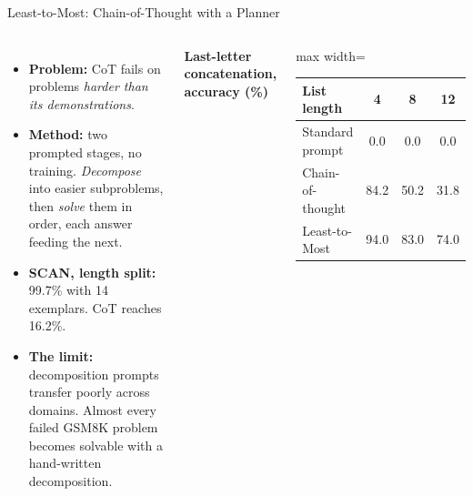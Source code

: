 \begin{frame}{Least-to-Most: Chain-of-Thought with a Planner}
    \begin{columns}[T,onlytextwidth]
        \begin{itemize}\itemsep0.45em
            \item \textbf{Problem:} CoT fails on problems \emph{harder than its demonstrations}.
            \item \textbf{Method:} two prompted stages, no training. \emph{Decompose} into easier subproblems, then \emph{solve} them in order, each answer feeding the next.
            \item \textbf{SCAN, length split:} 99.7\% with 14 exemplars. CoT reaches 16.2\%.
            \item \textbf{The limit:} decomposition prompts transfer poorly across domains. Almost every failed GSM8K problem becomes solvable with a hand-written decomposition.
        \end{itemize}
        \centering
        \small
        \textbf{Last-letter concatenation, accuracy (\%)}

        \vspace{0.3em}
        \begin{adjustbox}{max width=\linewidth}\begin{tabular}{lccc}
            \toprule
            \textbf{List length} & \textbf{4} & \textbf{8} & \textbf{12} \\
            \midrule
            Standard prompt & 0.0 & 0.0 & 0.0 \\
            Chain-of-thought & 84.2 & 50.2 & 31.8 \\
            \rowcolor{KAUSTcyan!12} Least-to-Most & 94.0 & 83.0 & 74.0 \\
            \bottomrule
        \end{tabular}\end{adjustbox}

        \vspace{0.6em}
    \end{columns}
    \vspace{0.1em}
\end{frame}


